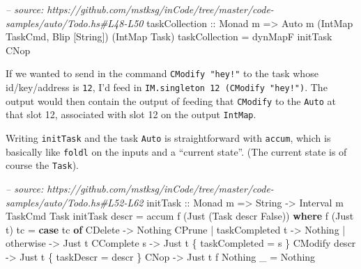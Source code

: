 \documentclass[]{article}
\newenvironment{Shaded}{}{}
\newcommand{\CommentTok}[1]{\textcolor[rgb]{0.38,0.63,0.69}{\textit{#1}}}
\newcommand{\DataTypeTok}[1]{\textcolor[rgb]{0.56,0.13,0.00}{#1}}
\newcommand{\FunctionTok}[1]{\textcolor[rgb]{0.02,0.16,0.49}{#1}}
\newcommand{\KeywordTok}[1]{\textcolor[rgb]{0.00,0.44,0.13}{\textbf{#1}}}
\newcommand{\NormalTok}[1]{#1}
\newcommand{\OtherTok}[1]{\textcolor[rgb]{0.00,0.44,0.13}{#1}}
\begin{document}
\begin{Shaded}
\begin{Highlighting}[]
\CommentTok{-- source: https://github.com/mstksg/inCode/tree/master/code-samples/auto/Todo.hs#L48-L50}
\OtherTok{taskCollection ::} \DataTypeTok{Monad}\NormalTok{ m}
               \OtherTok{=>} \DataTypeTok{Auto}\NormalTok{ m (}\DataTypeTok{IntMap} \DataTypeTok{TaskCmd}\NormalTok{, }\DataTypeTok{Blip}\NormalTok{ [}\DataTypeTok{String}\NormalTok{]) (}\DataTypeTok{IntMap} \DataTypeTok{Task}\NormalTok{)}
\NormalTok{taskCollection }\FunctionTok{=}\NormalTok{ dynMapF initTask }\DataTypeTok{CNop}
\end{Highlighting}
\end{Shaded}

If we wanted to send in the command \texttt{CModify\ "hey!"} to the task whose
id/key/address is \texttt{12}, I'd feed in
\texttt{IM.singleton\ 12\ (CModify\ "hey!")}. The output would then contain the
output of feeding that \texttt{CModify} to the \texttt{Auto} at that slot 12,
associated with slot 12 on the output \texttt{IntMap}.

Writing \texttt{initTask} and the task \texttt{Auto} is straightforward with
\texttt{accum}, which is basically like \texttt{foldl} on the inputs and a
``current state''. (The current state is of course the \texttt{Task}).

\begin{Shaded}
\begin{Highlighting}[]
\CommentTok{-- source: https://github.com/mstksg/inCode/tree/master/code-samples/auto/Todo.hs#L52-L62}
\OtherTok{initTask ::} \DataTypeTok{Monad}\NormalTok{ m }\OtherTok{=>} \DataTypeTok{String} \OtherTok{->} \DataTypeTok{Interval}\NormalTok{ m }\DataTypeTok{TaskCmd} \DataTypeTok{Task}
\NormalTok{initTask descr }\FunctionTok{=}\NormalTok{ accum f (}\DataTypeTok{Just}\NormalTok{ (}\DataTypeTok{Task}\NormalTok{ descr }\DataTypeTok{False}\NormalTok{))}
  \KeywordTok{where}
\NormalTok{    f (}\DataTypeTok{Just}\NormalTok{ t) tc }\FunctionTok{=} \KeywordTok{case}\NormalTok{ tc }\KeywordTok{of}
                      \DataTypeTok{CDelete}                  \OtherTok{->} \DataTypeTok{Nothing}
                      \DataTypeTok{CPrune} \FunctionTok{|}\NormalTok{ taskCompleted t }\OtherTok{->} \DataTypeTok{Nothing}
                             \FunctionTok{|}\NormalTok{ otherwise       }\OtherTok{->} \DataTypeTok{Just}\NormalTok{ t}
                      \DataTypeTok{CComplete}\NormalTok{ s              }\OtherTok{->} \DataTypeTok{Just}\NormalTok{ t \{ taskCompleted }\FunctionTok{=}\NormalTok{ s \}}
                      \DataTypeTok{CModify}\NormalTok{ descr            }\OtherTok{->} \DataTypeTok{Just}\NormalTok{ t \{ taskDescr }\FunctionTok{=}\NormalTok{ descr \}}
                      \DataTypeTok{CNop}                     \OtherTok{->} \DataTypeTok{Just}\NormalTok{ t}
\NormalTok{    f }\DataTypeTok{Nothing}\NormalTok{ _   }\FunctionTok{=} \DataTypeTok{Nothing}
\end{Highlighting}
\end{Shaded}
\end{document}
